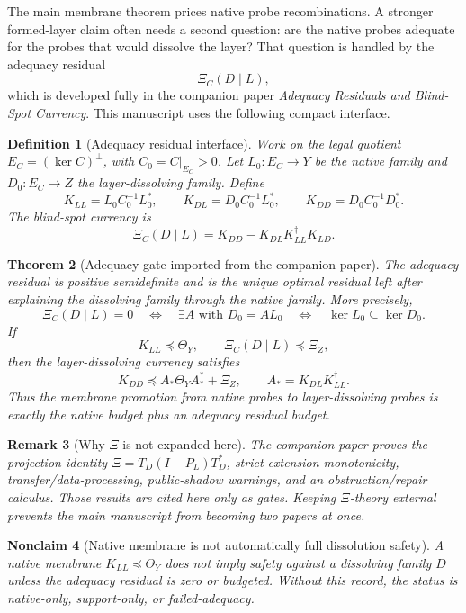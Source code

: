 \documentclass[11pt]{article}
\newtheorem{theorem}{Theorem}[section]
\newtheorem{definition}[theorem]{Definition}
\newtheorem{nonclaim}[theorem]{Nonclaim}
\newtheorem{remark}[theorem]{Remark}
\begin{document}
The main membrane theorem prices native probe recombinations.  A stronger formed-layer claim often needs a second question: are the native probes adequate for the probes that would dissolve the layer?  That question is handled by the adequacy residual
\[
  \Xi_C(D\mid L),
\]
which is developed fully in the companion paper \emph{Adequacy Residuals and Blind-Spot Currency}.  This manuscript uses the following compact interface.

\begin{definition}[Adequacy residual interface]
Work on the legal quotient \(E_C=(\ker C)^\perp\), with \(C_0=C|_{E_C}>0\).  Let \(L_0:E_C\to Y\) be the native family and \(D_0:E_C\to Z\) the layer-dissolving family.  Define
\[
  K_{LL}=L_0C_0^{-1}L_0^*,\qquad
  K_{DL}=D_0C_0^{-1}L_0^*,\qquad
  K_{DD}=D_0C_0^{-1}D_0^*.
\]
The blind-spot currency is
\[
  \boxed{\Xi_C(D\mid L)=K_{DD}-K_{DL}K_{LL}^\dagger K_{LD}.}
\]
\end{definition}

\begin{theorem}[Adequacy gate imported from the companion paper]
The adequacy residual is positive semidefinite and is the unique optimal residual left after explaining the dissolving family through the native family.  More precisely,
\[
  \Xi_C(D\mid L)=0
  \quad\Longleftrightarrow\quad
  \exists A\text{ with }D_0=AL_0
  \quad\Longleftrightarrow\quad
  \ker L_0\subseteq\ker D_0.
\]
If
\[
  K_{LL}\preceq\Theta_Y,
  \qquad
  \Xi_C(D\mid L)\preceq\Xi_Z,
\]
then the layer-dissolving currency satisfies
\[
  K_{DD}\preceq A_*\Theta_YA_*^*+\Xi_Z,
  \qquad
  A_*=K_{DL}K_{LL}^\dagger.
\]
Thus the membrane promotion from native probes to layer-dissolving probes is exactly the native budget plus an adequacy residual budget.
\end{theorem}

\begin{remark}[Why \(\Xi\) is not expanded here]
The companion paper proves the projection identity
\(\Xi=T_D(I-P_L)T_D^*\), strict-extension monotonicity, transfer/data-processing, public-shadow warnings, and an obstruction/repair calculus.  Those results are cited here only as gates.  Keeping \(\Xi\)-theory external prevents the main manuscript from becoming two papers at once.
\end{remark}

\begin{nonclaim}[Native membrane is not automatically full dissolution safety]
A native membrane \(K_{LL}\preceq\Theta_Y\) does not imply safety against a dissolving family \(D\) unless the adequacy residual is zero or budgeted.  Without this record, the status is native-only, support-only, or failed-adequacy.
\end{nonclaim}
\end{document}
